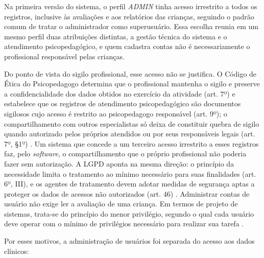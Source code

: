 Na primeira versão do sistema, o perfil \textit{ADMIN} tinha acesso irrestrito a todos os registros, inclusive às avaliações e aos relatórios das crianças, seguindo o padrão comum de tratar o administrador como superusuário. Essa escolha reunia em um mesmo perfil duas atribuições distintas, a gestão técnica do sistema e o atendimento psicopedagógico, e quem cadastra contas não é necessariamente o profissional responsável pelas crianças.

Do ponto de vista do sigilo profissional, esse acesso não se justifica. O Código de Ética do Psicopedagogo determina que o profissional mantenha o sigilo e preserve a confidencialidade dos dados obtidos no exercício da atividade (art. 7º) e estabelece que os registros de atendimento psicopedagógico são documentos sigilosos cujo acesso é restrito ao psicopedagogo responsável (art. 9º); o compartilhamento com outros especialistas só deixa de constituir quebra de sigilo quando autorizado pelos próprios atendidos ou por seus responsáveis legais (art. 7º, §1º) \cite{abpp2019_codigo_etica}. Um sistema que concede a um terceiro acesso irrestrito a esses registros faz, pelo \textit{software}, o compartilhamento que o próprio profissional não poderia fazer sem autorização. A LGPD aponta na mesma direção: o princípio da necessidade limita o tratamento ao mínimo necessário para suas finalidades (art. 6º, III), e os agentes de tratamento devem adotar medidas de segurança aptas a proteger os dados de acessos não autorizados (art. 46) \cite{brasil2018_lgpd}. Administrar contas de usuário não exige ler a avaliação de uma criança. Em termos de projeto de sistemas, trata-se do princípio do menor privilégio, segundo o qual cada usuário deve operar com o mínimo de privilégios necessário para realizar sua tarefa \cite{saltzer1975_protection}.

Por esses motivos, a administração de usuários foi separada do acesso aos dados clínicos:

